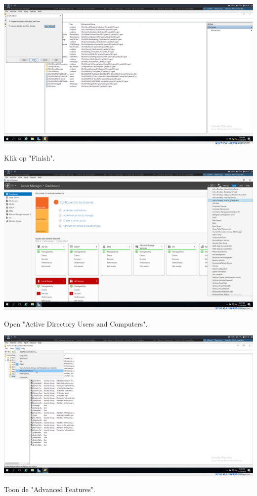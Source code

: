 \documentclass[a4paper]{article}
\begin{document}
\begin{center}
	\includegraphics[width=15cm]{Pictures/SCCM/1/1543499213.png}
	
	Klik op "Finish".
\end{center}
\begin{center}
	\includegraphics[width=15cm]{Pictures/SCCM/1/1543499275.png}
	
	Open "Active Directory Users and Computers".
\end{center}
\begin{center}
	\includegraphics[width=15cm]{Pictures/SCCM/1/1543499288.png}
	
	Toon de "Advanced Features".
\end{center}
\end{document}
